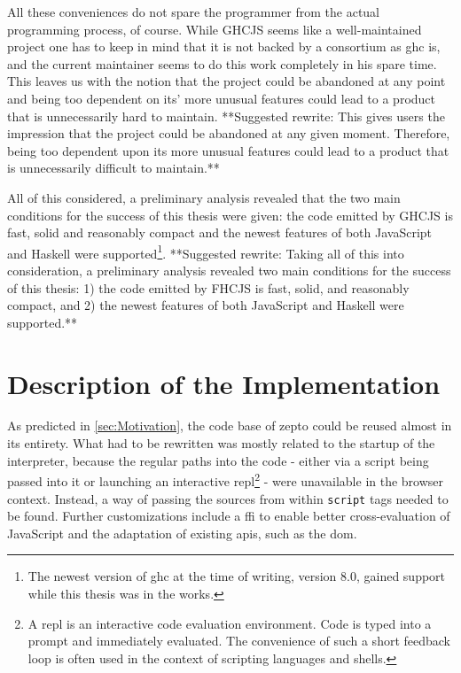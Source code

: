\documentclass[oneside,11pt,xetex]{scrbook}
\begin{document}
All these conveniences do not spare the programmer from the actual programming process, of course.
While GHCJS seems like a well-maintained project one has to keep in mind that it is not backed
by a consortium as \gls{ghc} is, and the current maintainer seems to do this work completely
in his spare time. This leaves us with the notion that the project could be abandoned at any point
and being too dependent on its' more unusual features could lead to a product that is unnecessarily
hard to maintain. **Suggested rewrite: This gives users the impression that the project could be abandoned at any given moment. Therefore, being too dependent upon its more unusual features could lead to a product that is unnecessarily difficult to maintain.**

All of this considered, a preliminary analysis revealed that the two main conditions for the success
of this thesis were given: the code emitted by GHCJS is fast, solid and reasonably compact and the
newest features of both JavaScript and Haskell were supported\footnote{The newest version of \gls{ghc}
at the time of writing, version 8.0, gained support while this thesis was in the works.}. **Suggested rewrite: Taking all of this into consideration, a preliminary analysis revealed two main conditions for the success of this thesis: 1) the code emitted by FHCJS is fast, solid, and reasonably compact, and 2) the newest features of both JavaScript and Haskell were supported.**

\section{Description of the Implementation}

As predicted in \ref{sec:Motivation}, the code base of zepto could be reused almost in its entirety.
What had to be rewritten was mostly related to the startup of the interpreter, because the regular
paths into the code - either via a script being passed into it or launching an interactive
\gls{repl}\footnote{A \gls{repl} is an interactive code evaluation environment. Code is typed into
a prompt and immediately evaluated. The convenience of such a short feedback loop is often used
in the context of scripting languages and shells.} - were unavailable in the browser context.
Instead, a way of passing the sources from within \texttt{script} tags needed to be found. Further
customizations include a \gls{ffi} to enable better cross-evaluation of JavaScript and the adaptation
of existing \gls{api}s, such as the \gls{dom}.
\end{document}
